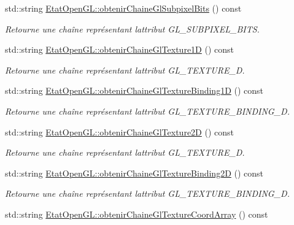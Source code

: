 \begin{DoxyCompactItemize}
std\+::string \hyperlink{group__utilitaire_ga842fdba84c1a6dc5261e2e694732df1a}{Etat\+Open\+G\+L\+::obtenir\+Chaine\+Gl\+Subpixel\+Bits} () const 
\begin{DoxyCompactList}\small\item\em Retourne une chaîne représentant l\textquotesingle{}attribut G\+L\+\_\+\+S\+U\+B\+P\+I\+X\+E\+L\+\_\+\+B\+I\+T\+S. \end{DoxyCompactList}\item 
std\+::string \hyperlink{group__utilitaire_ga60712e8970d469ba28a61541933011c4}{Etat\+Open\+G\+L\+::obtenir\+Chaine\+Gl\+Texture1\+D} () const 
\begin{DoxyCompactList}\small\item\em Retourne une chaîne représentant l\textquotesingle{}attribut G\+L\+\_\+\+T\+E\+X\+T\+U\+R\+E\+\_\+D. \end{DoxyCompactList}\item 
std\+::string \hyperlink{group__utilitaire_ga6ef71bae62c28f023f69aa0838ef1b31}{Etat\+Open\+G\+L\+::obtenir\+Chaine\+Gl\+Texture\+Binding1\+D} () const 
\begin{DoxyCompactList}\small\item\em Retourne une chaîne représentant l\textquotesingle{}attribut G\+L\+\_\+\+T\+E\+X\+T\+U\+R\+E\+\_\+\+B\+I\+N\+D\+I\+N\+G\+\_\+D. \end{DoxyCompactList}\item 
std\+::string \hyperlink{group__utilitaire_ga9c4d303e8a354ddb4678796eaceb45c6}{Etat\+Open\+G\+L\+::obtenir\+Chaine\+Gl\+Texture2\+D} () const 
\begin{DoxyCompactList}\small\item\em Retourne une chaîne représentant l\textquotesingle{}attribut G\+L\+\_\+\+T\+E\+X\+T\+U\+R\+E\+\_\+D. \end{DoxyCompactList}\item 
std\+::string \hyperlink{group__utilitaire_ga308bae30bed330cc281e0f2443cb43d2}{Etat\+Open\+G\+L\+::obtenir\+Chaine\+Gl\+Texture\+Binding2\+D} () const 
\begin{DoxyCompactList}\small\item\em Retourne une chaîne représentant l\textquotesingle{}attribut G\+L\+\_\+\+T\+E\+X\+T\+U\+R\+E\+\_\+\+B\+I\+N\+D\+I\+N\+G\+\_\+D. \end{DoxyCompactList}\item 
std\+::string \hyperlink{group__utilitaire_ga6e3e42a091a09f20c4885d62bd29d1fb}{Etat\+Open\+G\+L\+::obtenir\+Chaine\+Gl\+Texture\+Coord\+Array} () const 

\end{DoxyCompactItemize}
